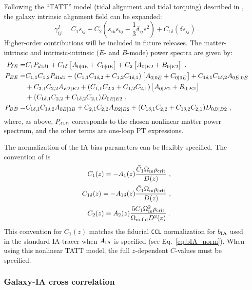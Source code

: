 \documentclass[\docopts]{\docclass}
\newcommand{\ccl}{{\tt CCL}\xspace}
\begin{document}
Following the ``TATT'' model (tidal alignment and tidal torquing) described in \cite{blazek19}, the galaxy intrinsic alignment field can be expanded:
\begin{equation}
    \gamma^{I}_{ij} = C_1 s_{ij} + C_2\left( s_{ik} s_{kj} - \frac{1}{3}\delta_{ij} s^2 \right) + C_{1\delta} (\delta s_{ij})~.
\end{equation}
Higher-order contributions will be included in future releases. The matter-intrinsic and intrinsic-intrinsic ($E$- and $B$-mode) power spectra are given by:
\begin{align}
\label{eq:dEtot}
P_{\delta E} =& C_1 P_{d1d1} + C_{1\delta} \left[A_{0|0E} + C_{0|0E}\right]
+ C_2 \left[ A_{0|E2} + B_{0|E2}\right]~, \\
\label{eq:EEtot}
P_{EE} =&
C_{1,1}C_{1,2} P_{d1d1} + (C_{1,1} C_{1\delta,2}+C_{1,2} C_{1\delta,1}) \left[A_{0|0E}+ C_{0|0E}\right] + C_{1\delta,1} C_{1\delta,2} A_{0E|0E} \notag\\
&+ C_{2,1} C_{2,2} A_{E2|E2} + (C_{1,1} C_{2,2} + C_{1,2} C_{2,1}) \left[ A_{0|E2} + B_{0|E2}\right] \notag \\
&+ (C_{1\delta,1} C_{2,2} + C_{1\delta,2} C_{2,1})D_{0E|E2}~,\\
\label{eq:BBtot}
P_{BB} =& C_{1\delta,1} C_{1\delta,2} A_{0B|0B} + C_{2,1} C_{2,2} A_{B2|B2} + (C_{1\delta,1} C_{2,2} + C_{1\delta,2} C_{2,1}) D_{0B|B2} ~,
\end{align} 
where, as above, $P_{d1d1}$ corresponds to the chosen nonlinear matter power spectrum,
and the other terms are one-loop PT expressions.

The normalization of the IA bias parameters can be flexibly specified. The convention of \cite{blazek19} is
\begin{align}
    C_1(z) = - A_{1}(z) \frac{\bar{C}_1 \Omega_{\rm m} \rho_{\rm crit}}{D(z)}~, \\
    C_{1 \delta}(z) = - A_{1 \delta}(z) \frac{\bar{C}_1 \Omega_{\rm m} \rho_{\rm crit}}{D(z)}~, \\
    C_{2}(z) = A_{2}(z) \frac{5\bar{C}_1 \Omega^2_{\rm m} \rho_{\rm crit}}{\Omega_{\rm m,fid} D^2(z)}~.
\end{align}
This convention for $C_1(z)$ matches the fiducial \ccl normalization for $b_{\rm IA}$ used in the standard IA
tracer when $A_{\rm IA}$ is specified (see Eq.~\ref{eq:bIA_norm}). When using this nonlinear TATT model,
the full $z$-dependent $C$-values must be specified.

\subsubsection{Galaxy-IA cross correlation}
\end{document}
